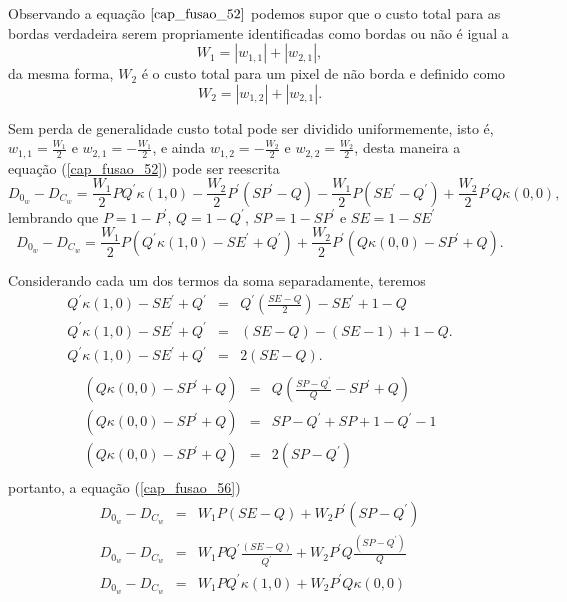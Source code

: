 Observando a equação $\ref{cap_fusao_52}$ podemos supor que o custo total para as bordas verdadeira serem propriamente identificadas como bordas ou não é igual a 
\begin{equation}\label{cap_fusao_53}
	W_1= |w_{1,1}| +|w_{2,1}|,
\end{equation}
da mesma forma, $W_2$ é o custo total para um pixel de não borda e definido como
\begin{equation}\label{cap_fusao_54}
	W_2= |w_{1,2}| +|w_{2,1}|.
\end{equation}

Sem perda de generalidade custo total pode ser dividido uniformemente, isto é, $w_{1,1}= \frac{W_1}{2}$ e $w_{2,1}=-\frac{W_1}{2}$, e ainda $w_{1,2}=-\frac{W_2}{2}$ e $w_{2,2}=\frac{W_2}{2}$, desta maneira a equação (\ref{cap_fusao_52}) pode ser reescrita
\begin{equation}\label{cap_fusao_55}
	D_{0_w} - D_{C_w}=\frac{W_1}{2}PQ^{'}\kappa(1,0) - \frac{W_2}{2}P^{'}(SP^{'}- Q) - \frac{W_1}{2}P(SE^{'}-Q^{'}) + \frac{W_2}{2}P^{'}Q\kappa(0,0),
\end{equation}
lembrando que $P=1-P^{'}$, $Q=1-Q^{'}$, $SP=1-SP^{'}$ e $SE=1-SE^{'}$
\begin{equation}\label{cap_fusao_56}
	D_{0_w} - D_{C_w}=\frac{W_1}{2}P\left(Q^{'}\kappa(1,0) - SE^{'}+Q^{'}\right) +\frac{W_2}{2}P^{'}\left(Q\kappa(0,0)-SP^{'}+Q\right).
\end{equation}

Considerando cada um dos termos da soma separadamente, teremos
\begin{equation}\nonumber
	\begin{array}{lll}
		Q^{'}\kappa(1,0) - SE^{'}+Q^{'}&=& Q^{'}\left(\frac{SE-Q}{2}\right) - SE^{'}+ 1 - Q \\
		Q^{'}\kappa(1,0) - SE^{'}+Q^{'}&=& (SE-Q) - (SE- 1) + 1 - Q.\\
		Q^{'}\kappa(1,0) - SE^{'}+Q^{'}&=& 2(SE-Q).\\
	\end{array}	
\end{equation}
\begin{equation}\nonumber
	\begin{array}{lll}
		\left(Q\kappa(0,0)-SP^{'}+Q\right)&=&Q\left(\frac{SP-Q^{'}}{Q}-SP^{'}+Q\right)\\
		\left(Q\kappa(0,0)-SP^{'}+Q\right)&=&SP-Q^{'}+SP+1-Q^{'}-1\\
		\left(Q\kappa(0,0)-SP^{'}+Q\right)&=&2(SP-Q^{'})\\
	\end{array}	
\end{equation}
portanto, a equação (\ref{cap_fusao_56})
\begin{equation}\label{cap_fusao_57}
	\begin{array}{lll}
		D_{0_w} - D_{C_w}&=&W_1P(SE-Q) +W_2P^{'}(SP - Q^{'})\\
		D_{0_w} - D_{C_w}&=&W_1PQ^{'}\frac{(SE-Q)}{Q^{'}} +W_2P^{'}Q\frac{(SP - Q^{'})}{Q}\\
		D_{0_w} - D_{C_w}&=&W_1PQ^{'}\kappa(1,0) +W_2P^{'}Q\kappa(0,0)\\
	\end{array}	
\end{equation}

